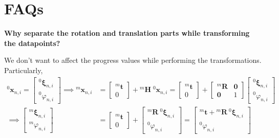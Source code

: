 \section{FAQs}\label{sec:faq}

\textbf{Why separate the rotation and translation parts while transforming the datapoints?}

We don't want to affect the progress values while performing the transformations.
Particularly,
\begin{equation}
    \begin{aligned}
        {}^{0}\boldsymbol{x}_{n, i}
        =
        \begin{bmatrix}
            {}^{0}\boldsymbol{\xi}_{n, i} \\
            {}^{0}\varphi_{n, i}
        \end{bmatrix}
        \implies
        {}^{m}\boldsymbol{x}_{n, i}
         & =
        \begin{bmatrix}
            {}^{m}\boldsymbol{t} \\
            0
        \end{bmatrix}
        +
        {}^{m}\boldsymbol{H} \; {}^{0}\boldsymbol{x}_{n, i}
        =
        \begin{bmatrix}
            {}^{m}\boldsymbol{t} \\
            0
        \end{bmatrix}
        +
        \begin{bmatrix}
            {}^{m}\boldsymbol{R} & \boldsymbol{0} \\
            \boldsymbol{0}       & 1
        \end{bmatrix}
        \begin{bmatrix}
            {}^{0}\boldsymbol{\xi}_{n, i} \\
            {}^{0}\varphi_{n, i}
        \end{bmatrix}
        \\
        \implies
        \begin{bmatrix}
            {}^{m}\boldsymbol{\xi}_{n, i} \\
            {}^{m}\varphi_{n, i}
        \end{bmatrix}
         & =
        \begin{bmatrix}
            {}^{m}\boldsymbol{t} \\
            0
        \end{bmatrix}
        +
        \begin{bmatrix}
            {}^{m}\boldsymbol{R} \ {}^{0}\boldsymbol{\xi}_{n, i} \\
            {}^{0}\varphi_{n, i}
        \end{bmatrix}
        =
        \begin{bmatrix}
            {}^{m}\boldsymbol{t} + {}^{m}\boldsymbol{R} \ {}^{0}\boldsymbol{\xi}_{n, i} \\
            {}^{0}\varphi_{n, i}
        \end{bmatrix}
    \end{aligned}
\end{equation}

